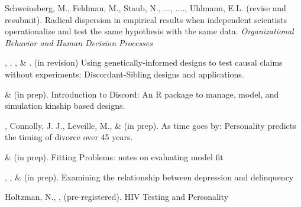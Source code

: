 \item Schweinsberg, M., Feldman, M., Staub, N., ..., \meb ...., Uhlmann, E.L. (revise and resubmit). Radical dispersion in empirical results when independent scientists operationalize and test the same hypothesis with the same data. \textit{Organizational Behavior and Human Decision Processes}




\item \meb, \jt, \yrh, \& \joe. (in revision) Using genetically-informed designs to test causal claims without experiments: Discordant-Sibling designs and applications. \href{https://osf.io/zpdwt/}{\small\color{blue}{osf.io/zpdwt/}}%

\item \jt \& \meb (in prep). Introduction to Discord: An R package to manage, model, and simulation kinship based designs.

\item \meb, Connolly, J. J., Leveille, M., \& \jjj (in prep). As time goes by: Personality predicts the timing of divorce over 45 years.%

\item \meb \& \joe (in prep). Fitting Problems: notes on evaluating model fit
%
\item \emsims, \jt, \& \meb (in prep). Examining the relationship between depression and delinquency



\item Holtzman, N., \meb, \etal (pre-registered). HIV Testing and Personality






